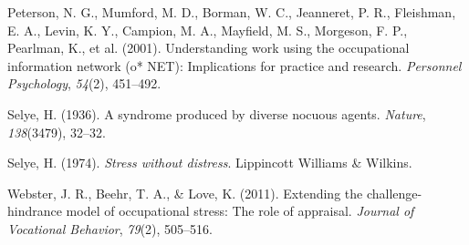 \documentclass[
  man]{apa6}
\newlength{\cslhangindent}
\newlength{\cslentryspacingunit} %
\newenvironment{CSLReferences}[2] %
 {%
  \setlength{\parindent}{0pt}
  \ifodd #1
  \let\oldpar\par
  \def\par{\hangindent=\cslhangindent\oldpar}
  \fi
  \setlength{\parskip}{#2\cslentryspacingunit}
 }%
 {}
\begin{document}
\begin{CSLReferences}{1}{0}
\leavevmode{}%
Peterson, N. G., Mumford, M. D., Borman, W. C., Jeanneret, P. R., Fleishman, E. A., Levin, K. Y., Campion, M. A., Mayfield, M. S., Morgeson, F. P., Pearlman, K., et al. (2001). Understanding work using the occupational information network (o* NET): Implications for practice and research. \emph{Personnel Psychology}, \emph{54}(2), 451--492.

\leavevmode{}%
Selye, H. (1936). A syndrome produced by diverse nocuous agents. \emph{Nature}, \emph{138}(3479), 32--32.

\leavevmode{}%
Selye, H. (1974). \emph{Stress without distress}. Lippincott Williams \& Wilkins.

\leavevmode{}%
Webster, J. R., Beehr, T. A., \& Love, K. (2011). Extending the challenge-hindrance model of occupational stress: The role of appraisal. \emph{Journal of Vocational Behavior}, \emph{79}(2), 505--516.

\end{CSLReferences}
\end{document}
